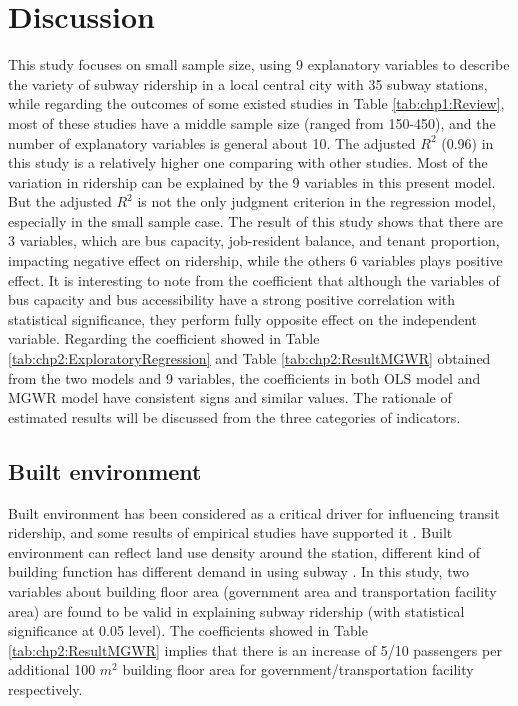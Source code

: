 \section{Discussion}
%
This study focuses on small sample size, using 9 explanatory variables to describe the variety of subway ridership in a local central city with 35 subway stations, while regarding the outcomes of some existed studies in Table \ref{tab:chp1:Review}, most of these studies have a middle sample size (ranged from 150-450), and the number of explanatory variables is general about 10. The adjusted $R^2$ (0.96) in this study is a relatively higher one comparing with other studies. Most of the variation in ridership can be explained by the 9 variables in this present model. But the adjusted $R^2$ is not the only judgment criterion in the regression model, especially in the small sample case. The result of this study shows that there are 3 variables, which are bus capacity, job-resident balance, and tenant proportion, impacting negative effect on ridership, while the others 6 variables plays positive effect. It is interesting to note from the coefficient that although the variables of bus capacity and bus accessibility have a strong positive correlation with statistical significance, they perform fully opposite effect on the independent variable. Regarding the coefficient showed in Table \ref{tab:chp2:ExploratoryRegression} and Table \ref{tab:chp2:ResultMGWR} obtained from the two models and 9 variables, the coefficients in both OLS model and MGWR model have consistent signs and similar values. The rationale of estimated results will be discussed from the three categories of indicators.

%
\subsection{Built environment}
%
Built environment has been considered as a critical driver for influencing transit ridership, and some results of empirical studies have supported it \cite{sohn2010factors,zhao2013influences,chakraborty2013land}. Built environment can reflect land use density around the station, different kind of building function has different demand in using subway \cite{chakraborty2013land}. In this study, two variables about building floor area (government area and transportation facility area) are found to be valid in explaining subway ridership (with statistical significance at 0.05 level). The coefficients showed in Table \ref{tab:chp2:ResultMGWR} implies that there is an increase of 5/10 passengers per additional 100 $m^2$ building floor area for government/transportation facility respectively. 


